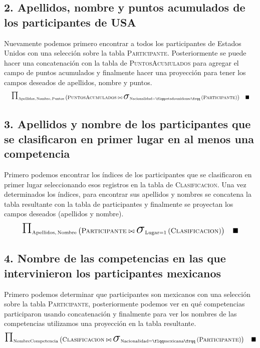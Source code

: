 \documentclass[a4paper, twoside, 12pt]{article}
\newcommand{\str}[1]{\mathrm{\flqq #1 \frqq}}
\newcommand{\tblstr}[1]{\mathrm{\textsc{#1}}}
\newcommand{\select}[4]{\makebox{\huge\ensuremath{\sigma}}_{\mathrm{#1} #2 #3}\left( #4 \right)}
\newcommand{\project}[2]{\makebox{\huge\ensuremath{\Pi}}_{\mathrm{#1}} \left( #2 \right)}
\newcommand{\concat}[2]{#1 \bowtie #2}
\begin{document}
\subsection*{2. Apellidos, nombre y puntos acumulados de los participantes de USA}
Nuevamente podemos primero encontrar a todos los participantes de Estados Unidos con una selección sobre la tabla \textsc{Participante}. Posteriormente se puede hacer una concatenación con la tabla de \textsc{PuntosAcumulados} para agregar el campo de puntos acumulados y finalmente hacer una proyección para tener los campos deseados de apellidos, nombre y puntos.
\vspace{-14pt}
\begin{equation*}
    \resizebox{\textwidth}{!}
    {
        $\project
            {\mathrm{Apellidos,\, Nombre,\, Puntos}}
            {\concat
                {\tblstr{PuntosAcumulados}}
                {\select
                    {Nacionalidad}
                    {=}
                    {\str{estadounidense}}
                    {\tblstr{Participante}}}} \quad \blacksquare$
    }
\end{equation*}

\subsection*{3. Apellidos y nombre de los participantes que se clasificaron en primer lugar en al menos una competencia}

Primero podemos encontrar los índices de los participantes que se clasificaron en primer lugar seleccionando esos registros en la tabla de \textsc{Clasificacion}. Una vez determinados los índices, para encontrar sus apellidos y nombres se concatena la tabla resultante con la tabla de participantes y finalmente se proyectan los campos deseados (apellidos y nombre).
\begin{equation*}
\project
    {\mathrm{Apellidos,\, Nombre}}
    {\concat
        {\tblstr{Participante}}
        {\select
            {Lugar}
            {=}
            {1}
            {\tblstr{Clasificacion}}}} \quad \blacksquare
\end{equation*}

\subsection*{4. Nombre de las competencias en las que intervinieron los participantes mexicanos}
Primero podemos determinar que participantes son mexicanos con una selección sobre la tabla \textsc{Participante}, posteriormente podemos ver en qué competencias participaron usando concatenación y finalmente para ver los nombres de las competencias utilizamos una proyección en la tabla resultante.
\vspace{-14pt}
\begin{equation*}
    \project
        {\mathrm{NombreCompetencia}}
        {\concat
            {\tblstr{Clasificacion}}
            {\select
                {Nacionalidad}
                {=}
                {\str{mexicana}}
                {\tblstr{Participante}}}} \quad \blacksquare
\end{equation*}
\end{document}
